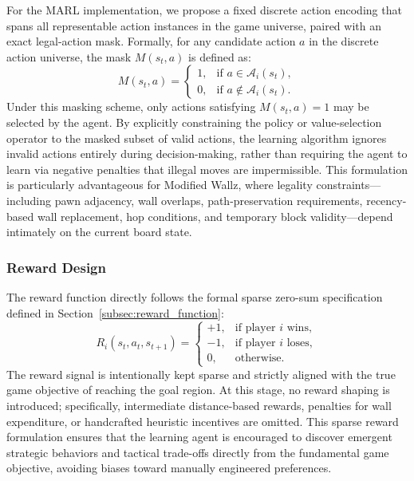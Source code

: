 \documentclass{article}
\begin{document}
For the MARL implementation, we propose a fixed discrete action encoding that spans all representable action instances in the game universe, paired with an exact legal-action mask. Formally, for any candidate action $a$ in the discrete action universe, the mask $M(s_t, a)$ is defined as:
\begin{equation}
M(s_t, a) =
\begin{cases}
1, & \text{if } a \in \mathcal{A}_i(s_t), \\
0, & \text{if } a \notin \mathcal{A}_i(s_t).
\end{cases}
\end{equation}
Under this masking scheme, only actions satisfying $M(s_t, a) = 1$ may be selected by the agent. By explicitly constraining the policy or value-selection operator to the masked subset of valid actions, the learning algorithm ignores invalid actions entirely during decision-making, rather than requiring the agent to learn via negative penalties that illegal moves are impermissible. This formulation is particularly advantageous for Modified Wallz, where legality constraints---including pawn adjacency, wall overlaps, path-preservation requirements, recency-based wall replacement, hop conditions, and temporary block validity---depend intimately on the current board state.

\subsubsection{Reward Design}
\label{subsubsec:reward_design}

The reward function directly follows the formal sparse zero-sum specification defined in Section~\ref{subsec:reward_function}:
\begin{equation}
R_i(s_t, a_t, s_{t+1}) =
\begin{cases}
+1, & \text{if player } i \text{ wins}, \\
-1, & \text{if player } i \text{ loses}, \\
0, & \text{otherwise}.
\end{cases}
\end{equation}
The reward signal is intentionally kept sparse and strictly aligned with the true game objective of reaching the goal region. At this stage, no reward shaping is introduced; specifically, intermediate distance-based rewards, penalties for wall expenditure, or handcrafted heuristic incentives are omitted. This sparse reward formulation ensures that the learning agent is encouraged to discover emergent strategic behaviors and tactical trade-offs directly from the fundamental game objective, avoiding biases toward manually engineered preferences.
\end{document}
